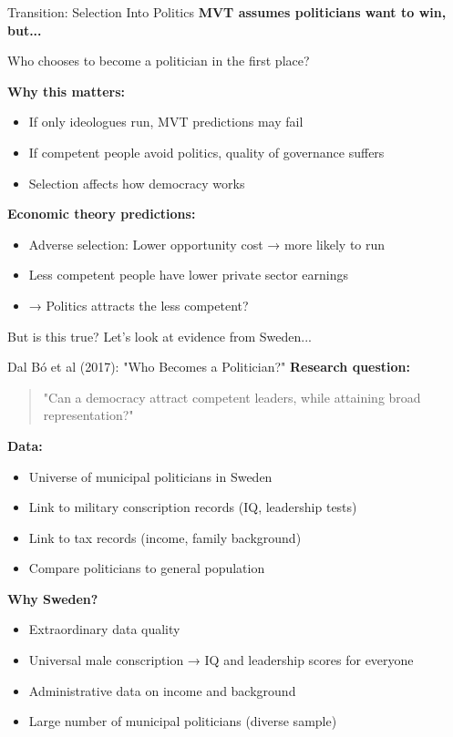 \documentclass[10pt]{beamer}
\begin{document}
\begin{frame}{Transition: Selection Into Politics}
\textbf{MVT assumes politicians want to win, but...}


\begin{center}
\Large \alert{Who chooses to become a politician in the first place?}
\end{center}




\textbf{Why this matters:}
\begin{itemize}
\item If only ideologues run, MVT predictions may fail
\item If competent people avoid politics, quality of governance suffers
\item Selection affects how democracy works
\end{itemize}




\textbf{Economic theory predictions:}
\begin{itemize}
\item \alert{Adverse selection:} Lower opportunity cost → more likely to run
\item Less competent people have lower private sector earnings
\item → Politics attracts the less competent?
\end{itemize}



But is this true? Let's look at evidence from Sweden...
\end{frame}

\begin{frame}{Dal Bó et al (2017): "Who Becomes a Politician?"}
\textbf{Research question:}

\begin{quote}
"Can a democracy attract competent leaders, while attaining broad representation?"
\end{quote}



\textbf{Data:}
\begin{itemize}
\item Universe of municipal politicians in Sweden
\item Link to military conscription records (IQ, leadership tests)
\item Link to tax records (income, family background)
\item Compare politicians to general population
\end{itemize}



\textbf{Why Sweden?}
\begin{itemize}
\item Extraordinary data quality
\item Universal male conscription → IQ and leadership scores for everyone
\item Administrative data on income and background
\item Large number of municipal politicians (diverse sample)
\end{itemize}
\end{frame}
\end{document}
